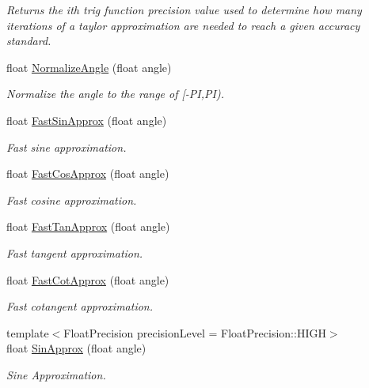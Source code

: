 \begin{DoxyCompactItemize}
\begin{DoxyCompactList}\small\item\em Returns the ith trig function precision value used to determine how many iterations of a taylor approximation are needed to reach a given accuracy standard. \end{DoxyCompactList}\item 
float \hyperlink{group___s_i_s_d_scalar_math_ga9ae15ff8e8601f2ed5381a5bce08d289}{Normalize\+Angle} (float angle)
\begin{DoxyCompactList}\small\item\em Normalize the angle to the range of \mbox{[}-\/\+P\+I,P\+I). \end{DoxyCompactList}\item 
float \hyperlink{group___s_i_s_d_scalar_math_gafb36256c1573aa72d03c3567f955bd83}{Fast\+Sin\+Approx} (float angle)
\begin{DoxyCompactList}\small\item\em Fast sine approximation. \end{DoxyCompactList}\item 
float \hyperlink{group___s_i_s_d_scalar_math_ga5c9038d14fbd579ef9860351b41fbf95}{Fast\+Cos\+Approx} (float angle)
\begin{DoxyCompactList}\small\item\em Fast cosine approximation. \end{DoxyCompactList}\item 
float \hyperlink{group___s_i_s_d_scalar_math_gae63b81e8a10d131334205c50b9b2166d}{Fast\+Tan\+Approx} (float angle)
\begin{DoxyCompactList}\small\item\em Fast tangent approximation. \end{DoxyCompactList}\item 
float \hyperlink{group___s_i_s_d_scalar_math_gab16e2d48a3790c9f448feefe7192dbe1}{Fast\+Cot\+Approx} (float angle)
\begin{DoxyCompactList}\small\item\em Fast cotangent approximation. \end{DoxyCompactList}\item 
{\footnotesize template$<$Float\+Precision precision\+Level = Float\+Precision\+::\+H\+I\+G\+H$>$ }\\float \hyperlink{group___s_i_s_d_scalar_math_gacf3bf50cb40374d40ffd25e382ca53c8}{Sin\+Approx} (float angle)
\begin{DoxyCompactList}\small\item\em Sine Approximation. \end{DoxyCompactList}\item 

\end{DoxyCompactItemize}
